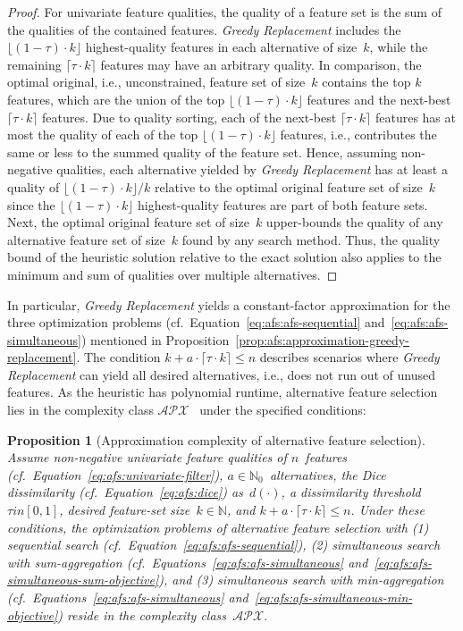\documentclass{article}
\newtheorem{proposition}{Proposition}
\theoremstyle{definition}
\begin{document}
%
\begin{proof}
	For univariate feature qualities, the quality of a feature set is the sum of the qualities of the contained features.
	\emph{Greedy Replacement} includes the $\lfloor (1 - \tau) \cdot k \rfloor$ highest-quality features in each alternative of size~$k$, while the remaining $\lceil \tau \cdot k \rceil$ features may have an arbitrary quality.
	In comparison, the optimal original, i.e., unconstrained, feature set of size~$k$ contains the top $k$ features, which are the union of the top $\lfloor (1 - \tau) \cdot k \rfloor$ features and the next-best $\lceil \tau \cdot k \rceil$ features.
	Due to quality sorting, each of the next-best $\lceil \tau \cdot k \rceil$ features has at most the quality of each of the top $\lfloor (1 - \tau) \cdot k \rfloor$ features, i.e., contributes the same or less to the summed quality of the feature set.
	Hence, assuming non-negative qualities, each alternative yielded by \emph{Greedy Replacement} has at least a quality of $\lfloor (1 - \tau) \cdot k \rfloor / k$ relative to the optimal original feature set of size~$k$ since the $\lfloor (1 - \tau) \cdot k \rfloor$ highest-quality features are part of both feature sets.
	Next, the optimal original feature set of size~$k$ upper-bounds the quality of any alternative feature set of size~$k$ found by any search method.
	Thus, the quality bound of the heuristic solution relative to the exact solution also applies to the minimum and sum of qualities over multiple alternatives.
\end{proof}
%
In particular, \emph{Greedy Replacement} yields a constant-factor approximation for the three optimization problems (cf.~Equation~\ref{eq:afs:afs-sequential} and~\ref{eq:afs:afs-simultaneous}) mentioned in Proposition~\ref{prop:afs:approximation-greedy-replacement}.
The condition $k + a \cdot \lceil \tau \cdot k \rceil \leq n$ describes scenarios where \emph{Greedy Replacement} can yield all desired alternatives, i.e., does not run out of unused features.
As the heuristic has polynomial runtime, alternative feature selection lies in the complexity class $\mathcal{APX}$~\cite{khanna1998syntactic} under the specified conditions:
%
\begin{proposition}[Approximation complexity of alternative feature selection]
	Assume non-negative univariate feature qualities of $n$~features (cf.~Equation~\ref{eq:afs:univariate-filter}), $a \in \mathbb{N}_0$~alternatives, the Dice dissimilarity (cf.~Equation~\ref{eq:afs:dice}) as~$d(\cdot)$, a dissimilarity threshold~$\tau in [0,1]$, desired feature-set size~$k \in \mathbb{N}$, and $k + a \cdot \lceil \tau \cdot k \rceil \leq n$.
	Under these conditions, the optimization problems of alternative feature selection with (1) sequential search (cf.~Equation~\ref{eq:afs:afs-sequential}), (2) simultaneous search with sum-aggregation (cf.~Equations~\ref{eq:afs:afs-simultaneous} and~\ref{eq:afs:afs-simultaneous-sum-objective}), and (3) simultaneous search with min-aggregation (cf.~Equations~\ref{eq:afs:afs-simultaneous} and~\ref{eq:afs:afs-simultaneous-min-objective}) reside in the complexity class~$\mathcal{APX}$.
	\label{prop:afs:approximation-apx}
\end{proposition}
\end{document}
